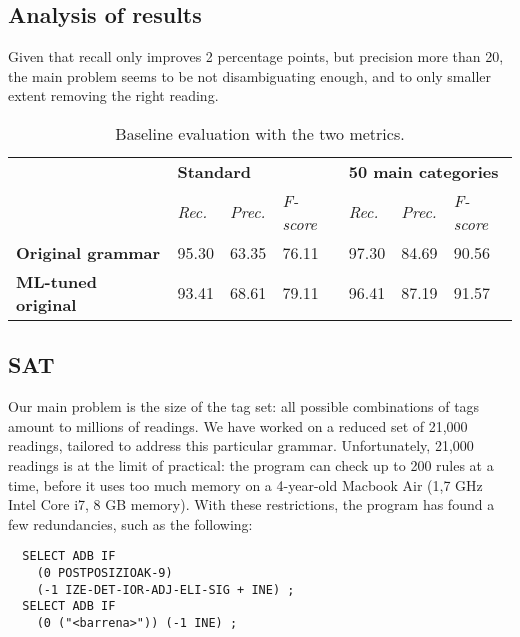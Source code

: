 \documentclass[11pt]{article}
\begin{document}
\subsection{Analysis of results}
Given that recall only improves 2 percentage points, but precision more than 20, the main problem
seems to be not disambiguating enough, and to only smaller extent removing the right reading.




\begin{table*}[t]
\centering
\label{my-label}
\begin{tabular}{l|l|l|l|l|l|l|}
\cline{2-7}
                                                 & \multicolumn{3}{l|}{\textbf{Standard}}            & \multicolumn{3}{l|}{\textbf{50 main categories}}  \\ \cline{2-7} 
                                                 & \textit{Rec.} & \textit{Prec.} & \textit{F-score} & \textit{Rec.} & \textit{Prec.} & \textit{F-score} \\ \hline
\multicolumn{1}{|l|}{\textbf{Original grammar}}  & 95.30       & 63.35        & 76.11    &  97.30        &  84.69         &  90.56           \\ \hline
\multicolumn{1}{|l|}{\textbf{ML-tuned original}} & 93.41       & 68.61        & 79.11    &  96.41        &  87.19         &  91.57           \\ \hline
\end{tabular}
\caption{Baseline evaluation with the two metrics.}
\label{table:res}
\end{table*}


\subsection{SAT}

Our main problem is the size of the tag set: all possible combinations of tags amount to millions of readings.
We have worked on a reduced set of 21,000 readings, tailored to address this particular grammar. 
Unfortunately, 21,000 readings is at the limit of practical: the program can check up to 200 rules at a time, before it uses too much memory on a 4-year-old Macbook Air (1,7 GHz Intel Core i7, 8 GB memory). 
With these restrictions, the program has found a few redundancies, such as the following:

\begin{verbatim}
  SELECT ADB IF
    (0 POSTPOSIZIOAK-9) 
    (-1 IZE-DET-IOR-ADJ-ELI-SIG + INE) ;
  SELECT ADB IF  
    (0 ("<barrena>")) (-1 INE) ;
\end{verbatim}
\end{document}
